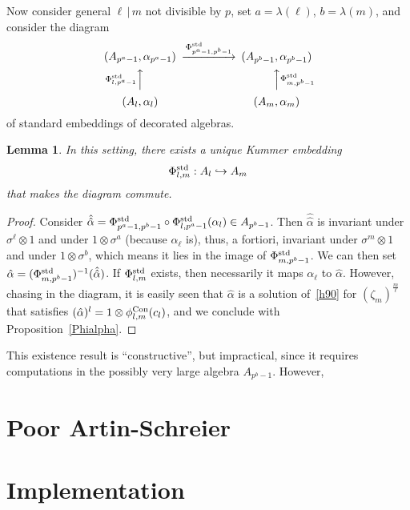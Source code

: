 \documentclass{sig-alternate}
\newtheorem{lemma}[theorem]{Lemma}
\begin{document}
Now consider general $\ell\,|\,m$ not divisible by $p$,
set $a=\lambda(\ell)$, $b=\lambda(m)$, and consider the diagram
\begin{equation*}
\label{3cotes}
\begin{CD}
(A_{p^a-1},\alpha_{p^a-1}) @>{\embedalg{p^a-1}{p^b-1}}>> (A_{p^b-1},\alpha_{p^b-1}) \\
@A{\embedalg{l}{p^a-1}}AA @AA{\embedalg{m}{p^b-1}}A\\
(A_\ell,\alpha_\ell) @. (A_m,\alpha_m)
\end{CD}
\end{equation*}
of standard embeddings of decorated algebras.
\begin{lemma}
In this setting, there exists a unique Kummer embedding
\[ {\Phi^{\textrm{std}}_{{l},{m}}}:A_l\hookrightarrow A_m \]
that makes the diagram commute.
\end{lemma}
\begin{proof}
Consider $\hat{\hat\alpha}={\Phi^{\textrm{std}}_{{p^a-1},{p^b-1}}}\circ{\Phi^{\textrm{std}}_{{l},{p^a-1}}}(\alpha_l)\in A_{p^b-1}$.
Then $\hat{\hat\alpha}$ is invariant under $\sigma^\ell\otimes1$ and
under $1\otimes\sigma^a$ (because $\alpha_\ell$ is),
thus, a fortiori, invariant under $\sigma^m\otimes1$ and
under $1\otimes\sigma^b$, which means it lies in the image
of ${\Phi^{\textrm{std}}_{{m},{p^b-1}}}$.
We can then set $\hat\alpha=({\Phi^{\textrm{std}}_{{m},{p^b-1}}})^{-1}(\hat{\hat\alpha})$.
If ${\Phi^{\textrm{std}}_{{l},{m}}}$ exists, then necessarily it maps $\alpha_\ell$
to $\hat\alpha$.
However, chasing in the diagram, it is easily seen that $\hat\alpha$ is
a solution of~\eqref{h90} for $(\zeta_m)^{\frac{m}{\ell}}$ that
satisfies $(\hat{\alpha})^l=1\otimes{\phi^{\textrm{Con}}_{{l},{m}}}(c_l)$,
and we conclude with Proposition~\ref{Phialpha}.
\end{proof}
This existence result is ``constructive'', but impractical,
since it requires computations in the possibly very large algebra $A_{p^b-1}$.
However,

\section{Poor Artin-Schreier}
\label{sec:A-S}



\section{Implementation}
\label{sec:implementation}



\end{document}
